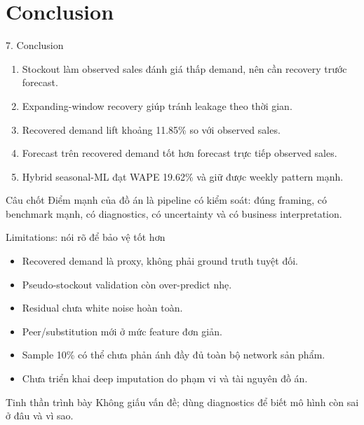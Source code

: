 \documentclass[aspectratio=169,10pt]{beamer}
\begin{document}
\section{Conclusion}
\begin{frame}{7. Conclusion}
    \begin{enumerate}
        \item Stockout làm observed sales đánh giá thấp demand, nên cần recovery trước forecast.
        \item Expanding-window recovery giúp tránh leakage theo thời gian.
        \item Recovered demand lift khoảng 11.85\% so với observed sales.
        \item Forecast trên recovered demand tốt hơn forecast trực tiếp observed sales.
        \item Hybrid seasonal-ML đạt WAPE 19.62\% và giữ được weekly pattern mạnh.
    \end{enumerate}
    \vspace{0.2cm}
    \begin{block}{Câu chốt}
    Điểm mạnh của đồ án là pipeline có kiểm soát: đúng framing, có benchmark mạnh, có diagnostics, có uncertainty và có business interpretation.
    \end{block}
\end{frame}

\begin{frame}{Limitations: nói rõ để bảo vệ tốt hơn}
    \begin{itemize}
        \item Recovered demand là proxy, không phải ground truth tuyệt đối.
        \item Pseudo-stockout validation còn over-predict nhẹ.
        \item Residual chưa white noise hoàn toàn.
        \item Peer/substitution mới ở mức feature đơn giản.
        \item Sample 10\% có thể chưa phản ánh đầy đủ toàn bộ network sản phẩm.
        \item Chưa triển khai deep imputation do phạm vi và tài nguyên đồ án.
    \end{itemize}
    \vspace{0.2cm}
    \begin{block}{Tinh thần trình bày}
    Không giấu vấn đề; dùng diagnostics để biết mô hình còn sai ở đâu và vì sao.
    \end{block}
\end{frame}
\end{document}

